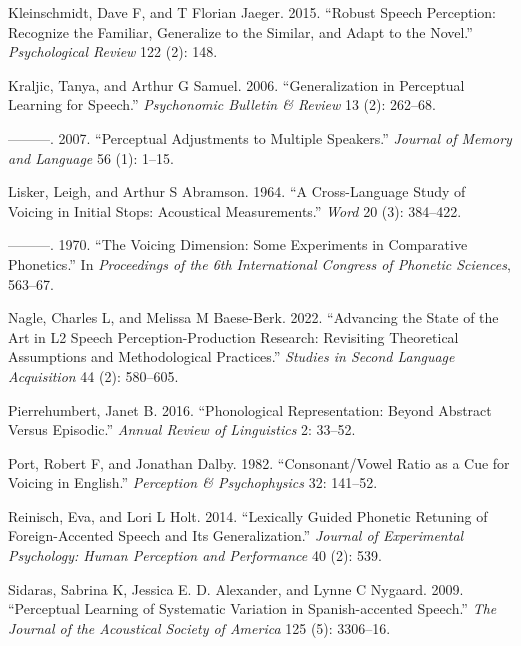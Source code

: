 \documentclass[
  preprint]{elsarticle}
\newlength{\cslhangindent}
\newlength{\cslentryspacingunit} %
\newenvironment{CSLReferences}[2] %
 {%
  \setlength{\parindent}{0pt}
  \ifodd #1
  \let\oldpar\par
  \def\par{\hangindent=\cslhangindent\oldpar}
  \fi
  \setlength{\parskip}{#2\cslentryspacingunit}
 }%
 {}
\begin{document}
\begin{CSLReferences}{1}{0}
\leavevmode{}%
Kleinschmidt, Dave F, and T Florian Jaeger. 2015. {``Robust Speech Perception: Recognize the Familiar, Generalize to the Similar, and Adapt to the Novel.''} \emph{Psychological Review} 122 (2): 148.

\leavevmode{}%
Kraljic, Tanya, and Arthur G Samuel. 2006. {``Generalization in Perceptual Learning for Speech.''} \emph{Psychonomic Bulletin \& Review} 13 (2): 262--68.

\leavevmode{}%
---------. 2007. {``Perceptual Adjustments to Multiple Speakers.''} \emph{Journal of Memory and Language} 56 (1): 1--15.

\leavevmode{}%
Lisker, Leigh, and Arthur S Abramson. 1964. {``A Cross-Language Study of Voicing in Initial Stops: Acoustical Measurements.''} \emph{Word} 20 (3): 384--422.

\leavevmode{}%
---------. 1970. {``The Voicing Dimension: Some Experiments in Comparative Phonetics.''} In \emph{Proceedings of the 6th International Congress of Phonetic Sciences}, 563--67.

\leavevmode{}%
Nagle, Charles L, and Melissa M Baese-Berk. 2022. {``Advancing the State of the Art in L2 Speech Perception-Production Research: Revisiting Theoretical Assumptions and Methodological Practices.''} \emph{Studies in Second Language Acquisition} 44 (2): 580--605.

\leavevmode{}%
Pierrehumbert, Janet B. 2016. {``Phonological Representation: Beyond Abstract Versus Episodic.''} \emph{Annual Review of Linguistics} 2: 33--52.

\leavevmode{}%
Port, Robert F, and Jonathan Dalby. 1982. {``Consonant/Vowel Ratio as a Cue for Voicing in English.''} \emph{Perception \& Psychophysics} 32: 141--52.

\leavevmode{}%
Reinisch, Eva, and Lori L Holt. 2014. {``Lexically Guided Phonetic Retuning of Foreign-Accented Speech and Its Generalization.''} \emph{Journal of Experimental Psychology: Human Perception and Performance} 40 (2): 539.

\leavevmode{}%
Sidaras, Sabrina K, Jessica E. D. Alexander, and Lynne C Nygaard. 2009. {``Perceptual Learning of Systematic Variation in {Spanish-accented} Speech.''} \emph{The Journal of the Acoustical Society of America} 125 (5): 3306--16.


\end{CSLReferences}
\end{document}
